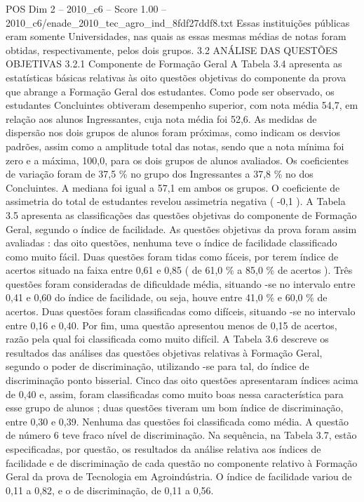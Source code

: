 \begin{textsample}{POS Dim 2 – 2010\_c6 – Score 1.00 – 2010\_c6/enade\_2010\_tec\_agro\_ind\_8fdf27ddf8.txt}
Essas instituições públicas eram somente Universidades, nas quais as essas mesmas médias de notas foram obtidas, respectivamente, pelos dois grupos. 3.2 ANÁLISE DAS QUESTÕES OBJETIVAS 3.2.1 Componente de Formação Geral A Tabela 3.4 apresenta as estatísticas básicas relativas às oito questões objetivas do componente da prova que abrange a Formação Geral dos estudantes.
Como pode ser observado, os estudantes Concluintes obtiveram desempenho superior, com nota média 54,7, em relação aos alunos Ingressantes, cuja nota média foi 52,6.
As medidas de dispersão nos dois grupos de alunos foram próximas, como indicam os desvios padrões, assim como a amplitude total das notas, sendo que a nota mínima foi zero e a máxima, 100,0, para os dois grupos de alunos avaliados.
Os coeficientes de variação foram de 37,5 \% no grupo dos Ingressantes a 37,8 \% no dos Concluintes.
A mediana foi igual a 57,1 em ambos os grupos.
O coeficiente de assimetria do total de estudantes revelou assimetria negativa ( -0,1 ).
A Tabela 3.5 apresenta as classificações das questões objetivas do componente de Formação Geral, segundo o índice de facilidade.
As questões objetivas da prova foram assim avaliadas : das oito questões, nenhuma teve o índice de facilidade classificado como muito fácil.
Duas questões foram tidas como fáceis, por terem índice de acertos situado na faixa entre 0,61 e 0,85 ( de 61,0 \% a 85,0 \% de acertos ).
Três questões foram consideradas de dificuldade média, situando -se no intervalo entre 0,41 e 0,60 do índice de facilidade, ou seja, houve entre 41,0 \% e 60,0 \% de acertos.
Duas questões foram classificadas como difíceis, situando -se no intervalo entre 0,16 e 0,40.
Por fim, uma questão apresentou menos de 0,15 de acertos, razão pela qual foi classificada como muito difícil.
A Tabela 3.6 descreve os resultados das análises das questões objetivas relativas à Formação Geral, segundo o poder de discriminação, utilizando -se para tal, do índice de discriminação ponto bisserial.
Cinco das oito questões apresentaram índices acima de 0,40 e, assim, foram classificadas como muito boas nessa característica para esse grupo de alunos ; duas questões tiveram um bom índice de discriminação, entre 0,30 e 0,39.
Nenhuma das questões foi classificada como média.
A questão de número 6 teve fraco nível de discriminação.
Na sequência, na Tabela 3.7, estão especificadas, por questão, os resultados da análise relativa aos índices de facilidade e de discriminação de cada questão no componente relativo à Formação Geral da prova de Tecnologia em Agroindústria.
O índice de facilidade variou de 0,11 a 0,82, e o de discriminação, de 0,11 a 0,56.

\end{textsample}
